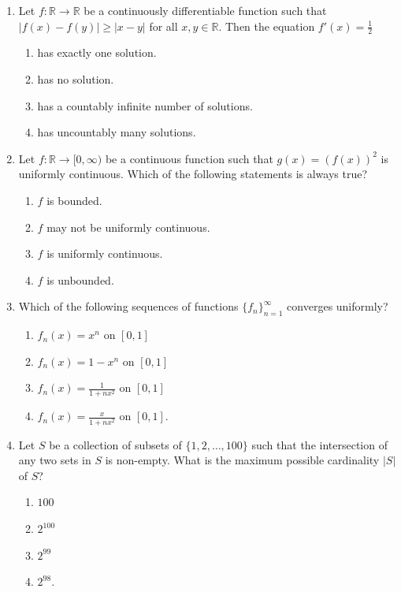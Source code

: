 \documentclass[11pt, a4paper]{article}
\begin{document}
\begin{enumerate}
  \item Let $f: \mathbb{R} \to \mathbb{R}$ be a continuously differentiable function such that $|f(x) - f(y)| \ge |x - y|$ for all $x, y \in \mathbb{R}$. Then the equation $f'(x) = \frac{1}{2}$
  \begin{enumerate}[label=\Alph*.]
    \item has exactly one solution.
    \item has no solution.
    \item has a countably infinite number of solutions.
    \item has uncountably many solutions.
  \end{enumerate}

  \item Let $f: \mathbb{R} \to [0, \infty)$ be a continuous function such that $g(x) = (f(x))^2$ is uniformly continuous. Which of the following statements is always true?
  \begin{enumerate}[label=\Alph*.]
    \item $f$ is bounded.
    \item $f$ may not be uniformly continuous.
    \item $f$ is uniformly continuous.
    \item $f$ is unbounded.
  \end{enumerate}

  \item Which of the following sequences of functions $\{f_n\}_{n=1}^\infty$ converges uniformly?
  \begin{enumerate}[label=\Alph*.]
    \item $f_n(x) = x^n$ on $[0, 1]$
    \item $f_n(x) = 1 - x^n$ on $[0, 1]$
    \item $f_n(x) = \frac{1}{1 + n x^2}$ on $[0, 1]$
    \item $f_n(x) = \frac{x}{1 + n x^2}$ on $[0, 1]$.
  \end{enumerate}

  \item Let $S$ be a collection of subsets of $\{1, 2, \dots, 100\}$ such that the intersection of any two sets in $S$ is non-empty. What is the maximum possible cardinality $|S|$ of $S$?
  \begin{enumerate}[label=\Alph*.]
    \item $100$
    \item $2^{100}$
    \item $2^{99}$
    \item $2^{98}$.
  \end{enumerate}


\end{enumerate}
\end{document}
